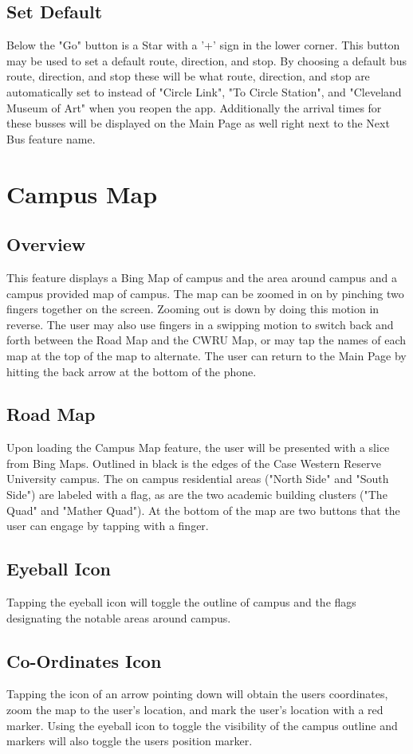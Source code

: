 \documentclass[pdftex,12pt,letter]{article}
\begin{document}
\subsection{Set Default}
Below the "Go" button is a Star with a '+' sign in the lower corner. This button may be used to set a default route, direction, and stop. By choosing a default bus route, direction, and stop these will be what route, direction, and stop are automatically set to instead of  "Circle Link", "To Circle Station", and "Cleveland Museum of Art" when you reopen the app. Additionally the arrival times for these busses will be displayed on the Main Page as well right next to the Next Bus feature name.

\section{Campus Map}
\subsection{Overview}
This feature displays a Bing Map of campus and the area around campus and a campus provided map of campus. The map can be zoomed in on by pinching two fingers together on the screen. Zooming out is down by doing this motion in reverse. The user may also use fingers in a swipping motion to switch back and forth between the Road Map and the CWRU Map, or may tap the names of each map at the top of the map to alternate. The user can return to the Main Page by hitting the back arrow at the bottom of the phone.
\subsection{Road Map}
Upon loading the Campus Map feature, the user will be presented with a slice from Bing Maps. Outlined in black is the edges of the Case Western Reserve University campus. The on campus residential areas ("North Side" and "South Side") are labeled with a flag, as are the two academic building clusters ("The Quad" and "Mather Quad"). At the bottom of the map are two buttons that the user can engage by tapping with a finger. 
\subsection{Eyeball Icon}
Tapping the eyeball icon will toggle the outline of campus and the flags designating the notable areas around campus. 
\subsection{Co-Ordinates Icon}
Tapping the icon of an arrow pointing down will obtain the users coordinates, zoom the map to the user's location, and mark the user's location with a red marker. Using the eyeball icon to toggle the visibility of the campus outline and markers will also toggle the users position marker.
\end{document}
